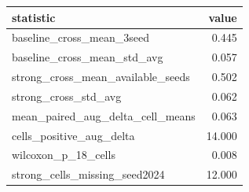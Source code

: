\begin{tabular}{lr}
\toprule
statistic & value \\
\midrule
baseline_cross_mean_3seed & 0.445 \\
baseline_cross_mean_std_avg & 0.057 \\
strong_cross_mean_available_seeds & 0.502 \\
strong_cross_std_avg & 0.062 \\
mean_paired_aug_delta_cell_means & 0.063 \\
cells_positive_aug_delta & 14.000 \\
wilcoxon_p_18_cells & 0.008 \\
strong_cells_missing_seed2024 & 12.000 \\
\bottomrule
\end{tabular}
